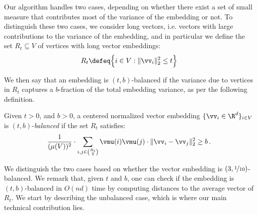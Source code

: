 \documentclass[letterpaper]{article}
\begin{document}
Our algorithm handles two cases, depending on whether there exist a set of small measure that contributes most of the variance of the embedding or not.
To distinguish these two cases, we consider long vectors, i.e. vectors with large contributions to the variance of the embedding, and in particular we define the set $R_t \subseteq V$ of vertices with long vector embeddings:
\begin{equation*}
R_t \defeq \Big\{ i \in V : \lVert \vv_i \rVert_2^2 \leq t \Big\}
\end{equation*}

We then say that an embedding is $(t, b)$-balanced if the variance due to vertices in $R_t$ captures a $b$-fraction of the total embedding variance, as per the following definition.

\begin{definition}\label{def.balanced-embedding}
Given $t > 0$, and $b > 0$, a centered normalized vector embedding $\{ \vv_{i} \in \R^d \}_{i \in V}$ is $(t, b)$-\emph{balanced} if the set $R_t$ satisfies:
\begin{equation*}
\frac{1}{(\mu(V))^2} \cdot \sum_{i,j \in \binom{R_t}{2}} \vmu(i) \vmu(j) \cdot \lVert \vv_i - \vv_j \rVert_2^2
\geq b \,.
\end{equation*}
\end{definition}

We distinguish the two cases based on whether the vector embedding is $(3,\nicefrac{1}{10})$-balanced.
We remark that, given $t$ and $b$, one can check if the embedding is $(t, b)$-balanced in $O(nd)$ time by computing distances to the average vector of $R_t$.
We start by describing the unbalanced case, which is where our main technical contribution lies.
\end{document}
